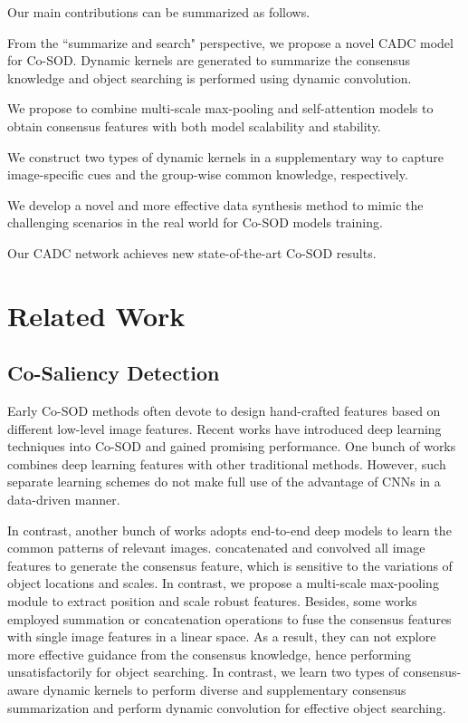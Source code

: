 \documentclass[10pt,twocolumn,letterpaper]{article}
\begin{document}
Our main contributions can be summarized as follows.
\begin{compactitem}
\item From the ``summarize and search" perspective, we propose a novel CADC model for Co-SOD. Dynamic kernels are generated to summarize the consensus knowledge and object searching is performed using dynamic convolution.

\item We propose to combine multi-scale max-pooling and self-attention models to obtain consensus features with both model scalability and stability.

\item We construct two types of dynamic kernels in a supplementary way to capture image-specific cues and the group-wise common knowledge, respectively.

\item We develop a novel and more effective data synthesis method to mimic the challenging scenarios in the real world for Co-SOD models training.

\item Our CADC network achieves new state-of-the-art Co-SOD results.

\end{compactitem}

\section{Related Work}

\subsection{Co-Saliency Detection}
Early Co-SOD methods \cite{fu2013cluster, li2011co} often devote to design hand-crafted features based on different low-level image features.
Recent works have introduced deep learning techniques into Co-SOD and gained promising performance. One bunch of works \cite{zhang2016co,zhang2019co} combines deep learning features with other traditional methods. However, such separate learning schemes do not make full use of the advantage of CNNs in a data-driven manner.

In contrast, another bunch of works adopts end-to-end deep models to learn the common patterns of relevant images. \cite{wei2019deep, wei2017group, ren2020co} concatenated and convolved all image features to generate the consensus feature, which is sensitive to the variations of object locations and scales. In contrast, we propose a multi-scale max-pooling module to extract position and scale robust features. Besides, some works \cite{wei2019deep, wei2017group, li2019detecting, wang2019robust, zha2020robust, ren2020co, zhang2020adaptive} employed summation or concatenation operations to fuse the consensus features with single image features in a linear space. As a result, they can not explore more effective guidance from the consensus knowledge, hence performing unsatisfactorily for object searching. In contrast, we learn two types of consensus-aware dynamic kernels to perform diverse and supplementary consensus summarization and perform dynamic convolution for effective object searching.
\end{document}
